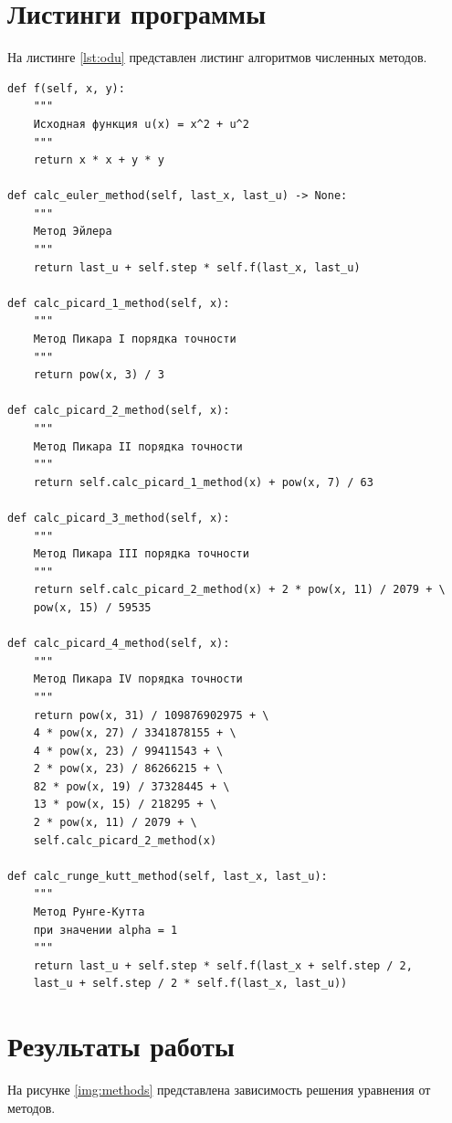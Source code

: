 \chapter{Листинги программы}
На листинге \ref{lst:odu} представлен листинг алгоритмов численных методов.
\begin{lstlisting}[label=lst:odu, caption=Код вычисления численных методов]
def f(self, x, y):
	"""
	Исходная функция u(x) = x^2 + u^2
	"""
	return x * x + y * y
	
def calc_euler_method(self, last_x, last_u) -> None:
	"""
	Метод Эйлера
	"""
	return last_u + self.step * self.f(last_x, last_u)
	
def calc_picard_1_method(self, x):
	"""
	Метод Пикара I порядка точности
	"""
	return pow(x, 3) / 3
	
def calc_picard_2_method(self, x):
	"""
	Метод Пикара II порядка точности
	"""
	return self.calc_picard_1_method(x) + pow(x, 7) / 63
	
def calc_picard_3_method(self, x):
	"""
	Метод Пикара III порядка точности
	"""
	return self.calc_picard_2_method(x) + 2 * pow(x, 11) / 2079 + \
	pow(x, 15) / 59535
	
def calc_picard_4_method(self, x):
	"""
	Метод Пикара IV порядка точности
	"""
	return pow(x, 31) / 109876902975 + \
	4 * pow(x, 27) / 3341878155 + \
	4 * pow(x, 23) / 99411543 + \
	2 * pow(x, 23) / 86266215 + \
	82 * pow(x, 19) / 37328445 + \
	13 * pow(x, 15) / 218295 + \
	2 * pow(x, 11) / 2079 + \
	self.calc_picard_2_method(x)
	
def calc_runge_kutt_method(self, last_x, last_u):
	"""
	Метод Рунге-Кутта
	при значении alpha = 1
	""" 
	return last_u + self.step * self.f(last_x + self.step / 2, 
	last_u + self.step / 2 * self.f(last_x, last_u))
\end{lstlisting}

\chapter{Результаты работы}
На рисунке \ref{img:methods} представлена зависимость решения уравнения от методов.
\begin{figure}[H]
\end{figure} 

